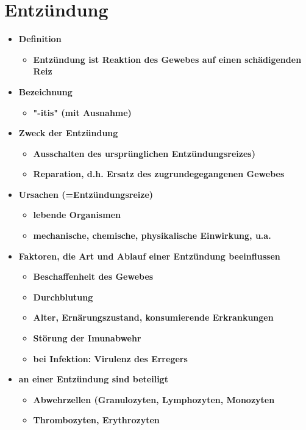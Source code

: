 \section*{Entzündung}
	\begin{itemize}
		\item \textbf{Definition}
			\begin{itemize}
				\item \textbf{Entzündung ist Reaktion des Gewebes auf einen schädigenden Reiz}
			\end{itemize}
		\item \textbf{Bezeichnung}
			\begin{itemize}
				\item \textbf{"-itis" (mit Ausnahme)}
			\end{itemize}
		\item \textbf{Zweck der Entzündung}
			\begin{itemize}
				\item \textbf{Ausschalten des ursprünglichen Entzündungsreizes)}
				\item \textbf{Reparation, d.h. Ersatz des zugrundegegangenen Gewebes}
			\end{itemize}
		\item \textbf{Ursachen (=Entzündungsreize)}
			\begin{itemize}
				\item \textbf{lebende Organismen}
				\item \textbf{mechanische, chemische, physikalische Einwirkung, u.a.}
			\end{itemize}
		\item \textbf{Faktoren, die Art und Ablauf einer Entzündung beeinflussen}
			\begin{itemize}
				\item \textbf{Beschaffenheit des Gewebes}
				\item \textbf{Durchblutung}
				\item \textbf{Alter, Ernärungszustand, konsumierende Erkrankungen}
				\item \textbf{Störung der Imunabwehr}
				\item \textbf{bei Infektion: Virulenz des Erregers}
			\end{itemize}
		\item \textbf{an einer Entzündung sind beteiligt}
			\begin{itemize}
				\item \textbf{Abwehrzellen (Granulozyten, Lymphozyten, Monozyten}
				\item \textbf{Thrombozyten, Erythrozyten}

\end{itemize}
\end{itemize}
